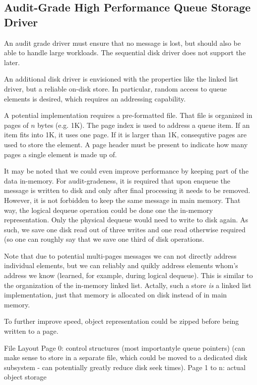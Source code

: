 \documentclass[a4paper,10pt]{article}
\begin{document}
\subsection{Audit-Grade High Performance Queue Storage Driver}
An audit grade driver must ensure that no message is lost, but should also be able to handle large workloads. The sequential disk driver does not support the later.

An additional disk driver is envisioned with the properties like the linked list driver, but a reliable on-disk store. In particular, random access to queue elements is desired, which requires an addressing capability.

A potential implementation requires a pre-formatted file. That file is organized in pages of $n$ bytes (e.g. 1K). The page index is used to address a queue item. If an item fits into 1K, it uses one page. If it is larger than 1K, consequtive pages are used to store the element. A page header must be present to indicate how many pages a single element is made up of.

It may be noted that we could even improve performance by keeping part of the data in-memory. For audit-gradeness, it is required that upon enqueue the message is written to disk and only after final processing it needs to be removed. However, it is not forbidden to keep the same message in main memory. That way, the logical dequeue operation could be done one the in-memory representation. Only the physical dequeue would need to write to disk again. As such, we save one disk read out of three writes and one read otherwise required (so one can roughly say that we save one third of disk operations.

Note that due to potential multi-pages messages we can not directly address individual elements, but we can reliably and quikly address elements whom's address we know (learned, for example, during logical dequeue). This is similar to the organization of the in-memory linked list. Actally, such a store \emph{is} a linked list implementation, just that memory is allocated on disk instead of in main memory.

To further improve speed, object representation could be zipped before being written to a page.

File Layout
Page 0: control structures (most importantyle queue pointers) (can make sense to store in a separate file, which could be moved to a dedicated disk subsystem - can potentially greatly reduce disk seek times).
Page 1 to n: actual object storage
\end{document}

